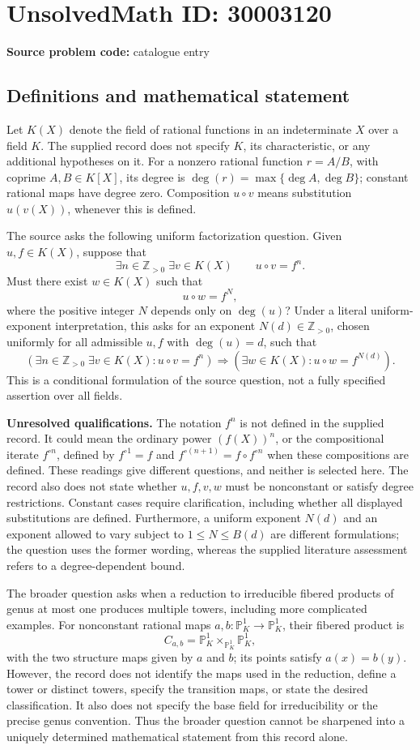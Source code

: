 \documentclass[11pt]{article}
\begin{document}
\section*{UnsolvedMath ID: 30003120}
\textbf{Source problem code:} catalogue entry
\subsection{Definitions and mathematical statement}
Let \(K(X)\) denote the field of rational functions in an indeterminate \(X\) over a field \(K\). The supplied record does not specify \(K\), its characteristic, or any additional hypotheses on it. For a nonzero rational function \(r=A/B\), with coprime \(A,B\in K[X]\), its degree is \(\deg(r)=\max\{\deg A,\deg B\}\); constant rational maps have degree zero. Composition \(u\circ v\) means substitution \(u(v(X))\), whenever this is defined.

The source asks the following uniform factorization question. Given \(u,f\in K(X)\), suppose that
\[
\exists n\in\mathbb Z_{>0}\;\exists v\in K(X)
\qquad u\circ v=f^n.
\]
Must there exist \(w\in K(X)\) such that
\[
 u\circ w=f^{N},
\]
where the positive integer \(N\) depends only on \(\deg(u)\)? Under a literal uniform-exponent interpretation, this asks for an exponent \(N(d)\in\mathbb Z_{>0}\), chosen uniformly for all admissible \(u,f\) with \(\deg(u)=d\), such that
\[
\left(\exists n\in\mathbb Z_{>0}\;\exists v\in K(X):u\circ v=f^n\right)
\Longrightarrow
\left(\exists w\in K(X):u\circ w=f^{N(d)}\right).
\]
This is a conditional formulation of the source question, not a fully specified assertion over all fields.

\textbf{Unresolved qualifications.} The notation \(f^n\) is not defined in the supplied record. It could mean the ordinary power \((f(X))^n\), or the compositional iterate \(f^{\circ n}\), defined by \(f^{\circ1}=f\) and \(f^{\circ(n+1)}=f\circ f^{\circ n}\) when these compositions are defined. These readings give different questions, and neither is selected here. The record also does not state whether \(u,f,v,w\) must be nonconstant or satisfy degree restrictions. Constant cases require clarification, including whether all displayed substitutions are defined. Furthermore, a uniform exponent \(N(d)\) and an exponent allowed to vary subject to \(1\leq N\leq B(d)\) are different formulations; the question uses the former wording, whereas the supplied literature assessment refers to a degree-dependent bound.

The broader question asks when a reduction to irreducible fibered products of genus at most one produces multiple towers, including more complicated examples. For nonconstant rational maps \(a,b:\mathbb P^1_K\to\mathbb P^1_K\), their fibered product is
\[
 C_{a,b}=\mathbb P^1_K\times_{\mathbb P^1_K}\mathbb P^1_K,
\]
with the two structure maps given by \(a\) and \(b\); its points satisfy \(a(x)=b(y)\). However, the record does not identify the maps used in the reduction, define a tower or distinct towers, specify the transition maps, or state the desired classification. It also does not specify the base field for irreducibility or the precise genus convention. Thus the broader question cannot be sharpened into a uniquely determined mathematical statement from this record alone.
\end{document}
